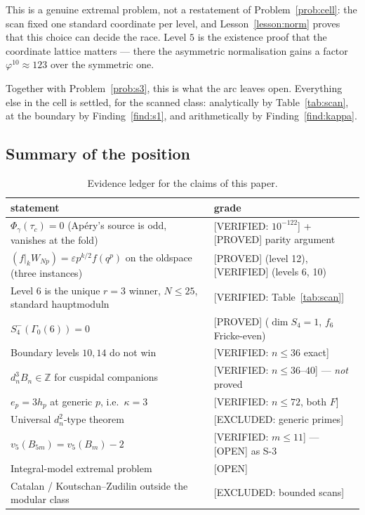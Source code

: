 \documentclass[11pt,reqno]{amsart}
\theoremstyle{plain}
\theoremstyle{definition}
\theoremstyle{remark}
\newcommand{\Z}{\mathbb{Z}}
\newcommand{\eps}{\varepsilon}
\newcommand{\dn}{d_n}
\newcommand{\Ga}{\Gamma_0}
\newcommand{\Proved}{\textup{\textsf{[PROVED]}}}
\newcommand{\Verified}{\textup{\textsf{[VERIFIED]}}}
\newcommand{\VerifiedR}[1]{\textup{\textsf{[VERIFIED: #1]}}}
\newcommand{\ExcludedR}[1]{\textup{\textsf{[EXCLUDED: #1]}}}
\newcommand{\Open}{\textup{\textsf{[OPEN]}}}
\begin{document}
This is a genuine extremal problem, not a restatement of
Problem~\ref{prob:cell}: the scan fixed one standard coordinate per
level, and Lesson~\ref{lesson:norm} proves that this choice can decide
the race. Level $5$ is the existence proof that the coordinate lattice
matters --- there the asymmetric normalisation gains a factor
$\varphi^{10}\approx123$ over the symmetric one.

Together with Problem~\ref{prob:s3}, this is what the arc leaves open.
Everything else in the cell is settled, for the scanned class:
analytically by Table~\ref{tab:scan}, at the boundary by
Finding~\ref{find:s1}, and arithmetically by Finding~\ref{find:kappa}.

\subsection{Summary of the position}

\begin{table}[h]
\centering
\renewcommand{\arraystretch}{1.25}
\begin{tabular}{@{}p{6.6cm}l@{}}
\toprule
statement & grade\\
\midrule
$\Phi_\gamma(\tau_c)=0$ (Ap\'ery's source is odd, vanishes at the fold)
  & \VerifiedR{$10^{-122}$} + \Proved{} parity argument\\
$(f|_kW_{Np})=\eps p^{k/2}f(q^p)$ on the oldspace (three instances)
  & \Proved{} (level 12), \Verified{} (levels 6, 10)\\
Level 6 is the unique $r=3$ winner, $N\le25$, standard hauptmoduln
  & \VerifiedR{Table~\ref{tab:scan}}\\
$S_4^-(\Ga(6))=0$
  & \Proved{} ($\dim S_4=1$, $f_6$ Fricke-even)\\
Boundary levels $10,14$ do not win
  & \VerifiedR{$n\le36$ exact}\\
$\dn^3B_n\in\Z$ for cuspidal companions
  & \VerifiedR{$n\le36$--$40$} --- \emph{not} proved\\
$e_p=3h_p$ at generic $p$, i.e.\ $\kappa=3$
  & \VerifiedR{$n\le72$, both $F$}\\
Universal $\dn^2$-type theorem
  & \ExcludedR{generic primes}\\
$v_5(B_{5m})=v_5(B_m)-2$
  & \VerifiedR{$m\le11$} --- \Open{} as S-3\\
Integral-model extremal problem
  & \Open\\
Catalan / Koutschan--Zudilin outside the modular class
  & \ExcludedR{bounded scans}\\
\bottomrule
\end{tabular}
\medskip
\caption{Evidence ledger for the claims of this paper.}
\label{tab:evidence}
\end{table}
\end{document}
